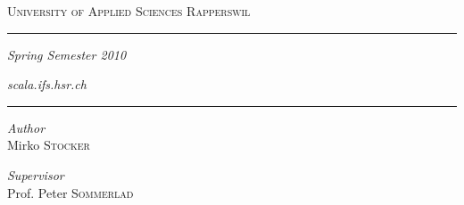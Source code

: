 \begin{titlepage}
 
\begin{center}
 
\textsc{\Large University of Applied Sciences Rapperswil}
 
\textsc{\subtitlename}

\rule{0.83\textwidth}{0.4pt}

\vspace{0.2cm}

\normalsize{\textit{Spring Semester 2010}}

\vspace*{\fill}
 
\Huge{\textit{\titlename}}

\vspace*{\fill}
\vspace{\baselineskip}

\normalsize{\textit{scala.ifs.hsr.ch}}

\rule{0.83\textwidth}{0.4pt}
\vskip0.35cm
\begin{minipage}{0.4\textwidth}
\begin{flushleft} \large
\emph{Author}\\
Mirko \textsc{Stocker}
\end{flushleft}
\end{minipage}
\begin{minipage}{0.4\textwidth}
\begin{flushright} \large
\emph{Supervisor} \\
Prof. Peter \textsc{Sommerlad}
\end{flushright}
\end{minipage}
 
\end{center}
 
\end{titlepage}
